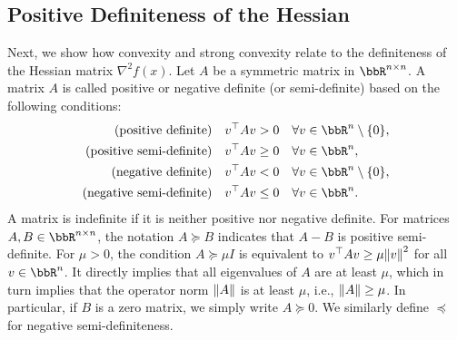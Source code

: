\documentclass[en]{subfiles}
\begin{document}
\subsection{Positive Definiteness of the Hessian}

Next, we show how convexity and strong convexity relate to the definiteness of the Hessian matrix $\nabla^2 f(x)$.
Let $A$ be a symmetric matrix in $\bbR^{n \times n}$. A matrix $A$ is called positive or negative definite (or semi-definite) based on the following conditions:
\begin{align*}
    \text{(positive definite)} \quad      & v^\top A v > 0 \quad \forall v \in \bbR^n \setminus \{0\}, \\
    \text{(positive semi-definite)} \quad & v^\top A v \ge 0 \quad \forall v \in \bbR^n,               \\
    \text{(negative definite)} \quad      & v^\top A v < 0 \quad \forall v \in \bbR^n \setminus \{0\}, \\
    \text{(negative semi-definite)} \quad & v^\top A v \le 0 \quad \forall v \in \bbR^n.
\end{align*}
A matrix is indefinite if it is neither positive nor negative definite.
For matrices $A,B \in \bbR^{n \times n}$, the notation $A \succeq B$ indicates that $A-B$ is positive semi-definite.
For $\mu > 0$, the condition $A \succeq \mu I$ is equivalent to $v^\top A v \ge \mu \norm{v}^2$ for all $v \in \bbR^n$.
It directly implies that all eigenvalues of $A$ are at least $\mu$, which in turn implies that the operator norm $\norm{A}$ is at least $\mu$, i.e., $\norm{A} \geq \mu$.
In particular, if $B$ is a zero matrix, we simply write $A \succeq 0$.
We similarly define $\preceq$ for negative semi-definiteness.
\end{document}
